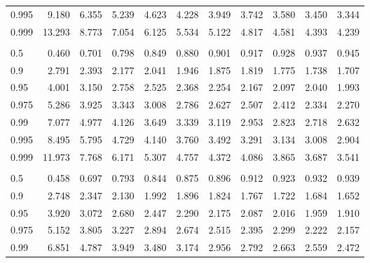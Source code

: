 \documentclass[
]{article}
\begin{document}
\begin{table}[H]
\begin{tabular}{lrrrrrrrrrr}
\hspace{1em}0.995 & 9.180 & 6.355 & 5.239 & 4.623 & 4.228 & 3.949 & 3.742 & 3.580 & 3.450 & 3.344\\
\hspace{1em}0.999 & 13.293 & 8.773 & 7.054 & 6.125 & 5.534 & 5.122 & 4.817 & 4.581 & 4.393 & 4.239\\
\addlinespace[0.3em]
\multicolumn{11}{l}{\textbf{$k_2=60$}}\\
\hspace{1em}0.5 & 0.460 & 0.701 & 0.798 & 0.849 & 0.880 & 0.901 & 0.917 & 0.928 & 0.937 & 0.945\\
\hspace{1em}0.9 & 2.791 & 2.393 & 2.177 & 2.041 & 1.946 & 1.875 & 1.819 & 1.775 & 1.738 & 1.707\\
\hspace{1em}0.95 & 4.001 & 3.150 & 2.758 & 2.525 & 2.368 & 2.254 & 2.167 & 2.097 & 2.040 & 1.993\\
\hspace{1em}0.975 & 5.286 & 3.925 & 3.343 & 3.008 & 2.786 & 2.627 & 2.507 & 2.412 & 2.334 & 2.270\\
\hspace{1em}0.99 & 7.077 & 4.977 & 4.126 & 3.649 & 3.339 & 3.119 & 2.953 & 2.823 & 2.718 & 2.632\\
\hspace{1em}0.995 & 8.495 & 5.795 & 4.729 & 4.140 & 3.760 & 3.492 & 3.291 & 3.134 & 3.008 & 2.904\\
\hspace{1em}0.999 & 11.973 & 7.768 & 6.171 & 5.307 & 4.757 & 4.372 & 4.086 & 3.865 & 3.687 & 3.541\\
\addlinespace[0.3em]
\multicolumn{11}{l}{\textbf{$k_2=120$}}\\
\hspace{1em}0.5 & 0.458 & 0.697 & 0.793 & 0.844 & 0.875 & 0.896 & 0.912 & 0.923 & 0.932 & 0.939\\
\hspace{1em}0.9 & 2.748 & 2.347 & 2.130 & 1.992 & 1.896 & 1.824 & 1.767 & 1.722 & 1.684 & 1.652\\
\hspace{1em}0.95 & 3.920 & 3.072 & 2.680 & 2.447 & 2.290 & 2.175 & 2.087 & 2.016 & 1.959 & 1.910\\
\hspace{1em}0.975 & 5.152 & 3.805 & 3.227 & 2.894 & 2.674 & 2.515 & 2.395 & 2.299 & 2.222 & 2.157\\
\hspace{1em}0.99 & 6.851 & 4.787 & 3.949 & 3.480 & 3.174 & 2.956 & 2.792 & 2.663 & 2.559 & 2.472\\

\end{tabular}
\end{table}
\end{document}
